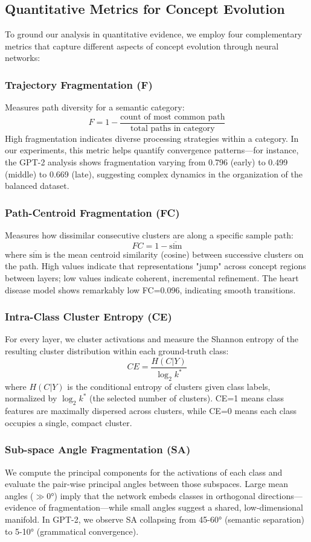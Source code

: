 \subsection{Quantitative Metrics for Concept Evolution}

To ground our analysis in quantitative evidence, we employ four complementary metrics that capture different aspects of concept evolution through neural networks:

\subsubsection{Trajectory Fragmentation (F)}
Measures path diversity for a semantic category:
$$F = 1 - \frac{\text{count of most common path}}{\text{total paths in category}}$$
High fragmentation indicates diverse processing strategies within a category. In our experiments, this metric helps quantify convergence patterns—for instance, the GPT-2 analysis shows fragmentation varying from 0.796 (early) to 0.499 (middle) to 0.669 (late), suggesting complex dynamics in the organization of the balanced dataset.

\subsubsection{Path-Centroid Fragmentation (FC)}
Measures how dissimilar consecutive clusters are along a specific sample path:
$$FC = 1 - \overline{\text{sim}}$$
where $\overline{\text{sim}}$ is the mean centroid similarity (cosine) between successive clusters on the path. High values indicate that representations "jump" across concept regions between layers; low values indicate coherent, incremental refinement. The heart disease model shows remarkably low FC=0.096, indicating smooth transitions.

\subsubsection{Intra-Class Cluster Entropy (CE)}
For every layer, we cluster activations and measure the Shannon entropy of the resulting cluster distribution within each ground-truth class:
$$CE = \frac{H(C|Y)}{\log_2 k^*}$$
where $H(C|Y)$ is the conditional entropy of clusters given class labels, normalized by $\log_2 k^*$ (the selected number of clusters). CE=1 means class features are maximally dispersed across clusters, while CE=0 means each class occupies a single, compact cluster.

\subsubsection{Sub-space Angle Fragmentation (SA)}
We compute the principal components for the activations of each class and evaluate the pair-wise principal angles between those subspaces. Large mean angles ($\gg 0°$) imply that the network embeds classes in orthogonal directions—evidence of fragmentation—while small angles suggest a shared, low-dimensional manifold. In GPT-2, we observe SA collapsing from 45-60° (semantic separation) to 5-10° (grammatical convergence).

